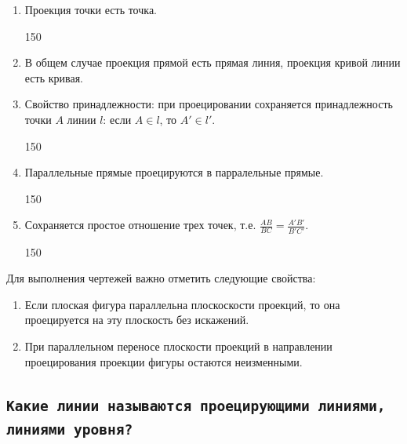 \begin{enumerate}
    \item Проекция точки есть точка.%

     {150}

    \item В общем случае проекция прямой есть прямая линия, проекция кривой линии есть кривая.

    \item Свойство принадлежности: при проецировании сохраняется принадлежность точки $A$ линии $l$: если $A \in l$, то $A' \in l'$.

     {150}

    \item Параллельные прямые проецируются в парралельные прямые.

     {150}
    \item Сохраняется простое отношение трех точек, т.е. {\Large $\frac{AB}{BC} = \frac{A'B'}{B'C'}$}.

     {150}

\end{enumerate}


Для выполнения чертежей важно отметить следующие свойства:

\begin{enumerate}
    \item Если плоская фигура параллельна плоскоскости проекций, то она проецируется на эту плоскость без искажений.
    
    
    \item При параллельном переносе плоскости проекций в направлении проецирования проекции фигуры остаются неизменными.
    
\end{enumerate}


\newpage
\subsection{\texttt{Какие линии называются проецирующими линиями, линиями уровня?}}

\begin{myquote}
    
\end{myquote}

